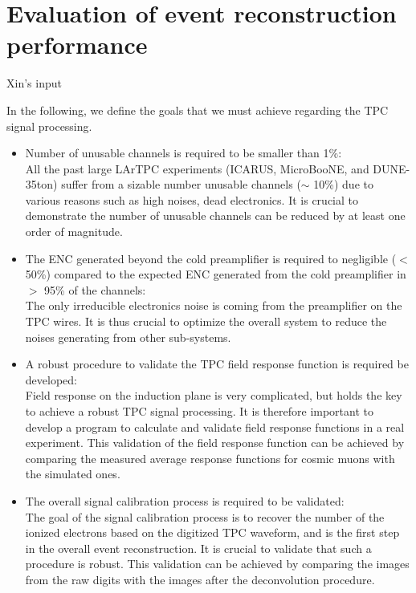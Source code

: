 \section{Evaluation of event reconstruction performance}

Xin's input

In the following, we define the goals that we must achieve regarding the TPC signal processing.
\begin{itemize}
\item Number of unusable channels is required to be smaller than 1\%: \\
All the past large LArTPC experiments (ICARUS, MicroBooNE, and DUNE-35ton) suffer from a sizable
number unusable channels ($\sim$ 10\%) due to various reasons such as high noises, dead electronics.
It is crucial to demonstrate the number of unusable channels can be reduced by at least one order
of magnitude. 
\item The ENC generated beyond the cold preamplifier is required to negligible ($<$ 50\%) compared to the 
expected ENC generated from the cold preamplifier in $>$ 95\% of the channels: \\
The only irreducible electronics noise is coming from the preamplifier on the TPC wires. It is thus
crucial to optimize the overall system to reduce the noises generating from other sub-systems. 
\item A robust procedure to validate the TPC field response function is required
be developed: \\
Field response on the induction plane is very complicated, but holds the key to achieve a robust TPC 
signal processing. It is therefore important to develop a program to calculate and validate field 
response functions in a real experiment. This validation of the field response function can be
achieved by comparing the measured average response functions for cosmic muons with the simulated
ones. 
\item The overall signal calibration process is required to be validated: \\
The goal of the signal calibration process is to recover the number of the ionized electrons based on
the digitized TPC waveform, and is the first step in the overall event reconstruction. It is crucial to 
validate that such a procedure is robust. This validation can be achieved by comparing the 
images from the raw digits with the images after the deconvolution procedure.
\end{itemize}

